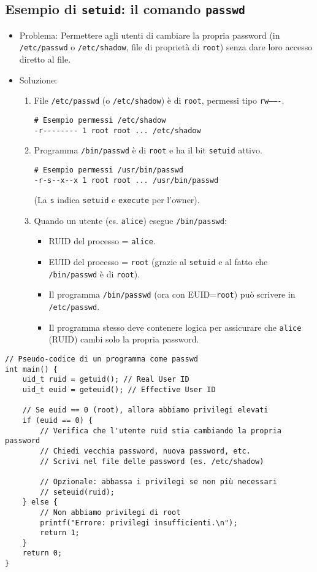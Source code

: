 \subsection{Esempio di \texttt{setuid}: il comando \texttt{passwd}}
\begin{itemize}
    \item Problema: Permettere agli utenti di cambiare la propria password (in \texttt{/etc/passwd} o \texttt{/etc/shadow}, file di proprietà di \texttt{root}) senza dare loro accesso diretto al file.
    \item Soluzione:
    \begin{enumerate}
        \item File \texttt{/etc/passwd} (o \texttt{/etc/shadow}) è di \texttt{root}, permessi tipo \texttt{rw-------}.
        \begin{verbatim}
# Esempio permessi /etc/shadow
-r-------- 1 root root ... /etc/shadow
        \end{verbatim}
        \item Programma \texttt{/bin/passwd} è di \texttt{root} e ha il bit \texttt{setuid} attivo.
        \begin{verbatim}
# Esempio permessi /usr/bin/passwd
-r-s--x--x 1 root root ... /usr/bin/passwd
        \end{verbatim}
        (La \texttt{s} indica \texttt{setuid} e \texttt{execute} per l'owner).
        \item Quando un utente (es. \texttt{alice}) esegue \texttt{/bin/passwd}:
        \begin{itemize}
            \item RUID del processo = \texttt{alice}.
            \item EUID del processo = \texttt{root} (grazie al \texttt{setuid} e al fatto che \texttt{/bin/passwd} è di \texttt{root}).
            \item Il programma \texttt{/bin/passwd} (ora con EUID=\texttt{root}) può scrivere in \texttt{/etc/passwd}.
            \item Il programma stesso deve contenere logica per assicurare che \texttt{alice} (RUID) cambi solo la propria password.
        \end{itemize}
    \end{enumerate}
\end{itemize}
\begin{verbatim}
// Pseudo-codice di un programma come passwd
int main() {
    uid_t ruid = getuid(); // Real User ID
    uid_t euid = geteuid(); // Effective User ID

    // Se euid == 0 (root), allora abbiamo privilegi elevati
    if (euid == 0) {
        // Verifica che l'utente ruid stia cambiando la propria password
        // Chiedi vecchia password, nuova password, etc.
        // Scrivi nel file delle password (es. /etc/shadow)
        
        // Opzionale: abbassa i privilegi se non più necessari
        // seteuid(ruid); 
    } else {
        // Non abbiamo privilegi di root
        printf("Errore: privilegi insufficienti.\n");
        return 1;
    }
    return 0;
}
\end{verbatim}

